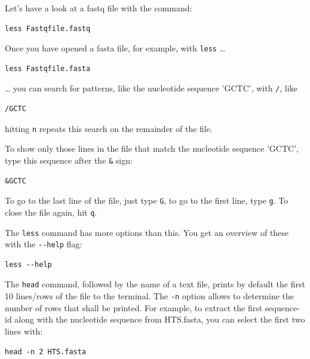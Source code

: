 \documentclass[11pt]{article}
\begin{document}
Let's have a look at a fastq file with the command:

\begin{verbatim}
less Fastqfile.fastq
\end{verbatim}

Once you have opened a fasta file, for example, with \texttt{less} \ldots{}

\begin{verbatim}
less Fastqfile.fasta
\end{verbatim}

\ldots{} you can search for patterns, like the nucleotide sequence 'GCTC', with \texttt{/}, like

\begin{verbatim}
/GCTC
\end{verbatim}

hitting \texttt{n} repeats this search on the remainder of the file.

To show only those lines in the file that match the nucleotide
sequence 'GCTC', type this sequence after the \texttt{\&} sign:

\begin{verbatim}
&GCTC
\end{verbatim}

To go to the last line of the file, just type \texttt{G}, to go to the first
line, type \texttt{g}. To close the file again, hit \texttt{q}.


The \texttt{less} command has more options than this. You get an overview of
these with the \texttt{-{}-help} flag:

\begin{verbatim}
less --help
\end{verbatim}


The \texttt{head} command, followed by the name of a text file, prints by
default the first 10 lines/rows of the file to the terminal.  The \texttt{-n}
option allows to determine the number of rows that shall be
printed. For example, to extract the first sequence-id along with the
nucleotide sequence from HTS.fasta, you can select the first two lines
with:

\begin{verbatim}
head -n 2 HTS.fasta
\end{verbatim}
\end{document}
